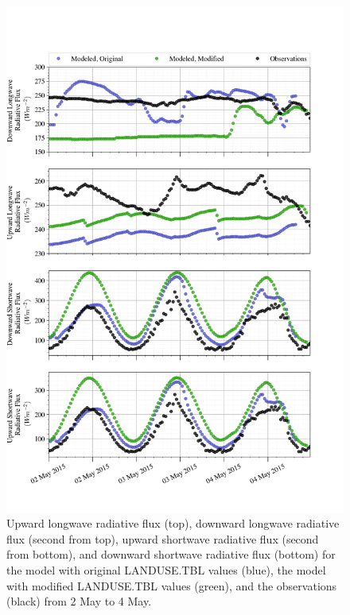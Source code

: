 \begin{figure}[p]
    \centering
    \vspace{-10em}
    \includegraphics[width=1\linewidth]{figures/chapter6/case2_lw_sw.png}
    \caption[Idealized Case 2 - Longwave radiative flux]{Upward longwave radiative flux (top), downward longwave radiative flux (second from top), upward shortwave radiative flux (second from bottom), and downward shortwave radiative flux (bottom) for the model with original LANDUSE.TBL values (blue), the model with modified LANDUSE.TBL values (green), and the observations (black) from 2 May to 4 May.}      
    \label{fig:c2:radiative}
\end{figure}

